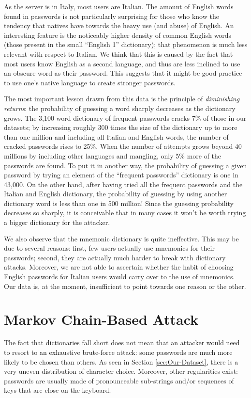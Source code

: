 \documentclass[a4paper,twocolumn]{article}
\begin{document}
As the server is in Italy, most users are Italian. The amount of English
words found in passwords is not particularly surprising for those
who know the tendency that natives have towards the heavy use (and
abuse) of English. An interesting feature is the noticeably higher
density of common English words (those present in the small {}``English
1'' dictionary); that phenomenon is much less relevant with respect
to Italian. We think that this is caused by the fact that most users
know English as a second language, and thus are less inclined to use
an obscure word as their password. This suggests that it might be
good practice to use one's native language to create stronger passwords.

The most important lesson drawn from this data is the principle of
\emph{diminishing returns}: the probability of guessing a word sharply
decreases as the dictionary grows. The 3,100-word dictionary of frequent
passwords cracks 7\% of those in our datasets; by increasing roughly
300 times the size of the dictionary up to more than one million and
including all Italian and English words, the number of cracked passwords
rises to 25\%. When the number of attempts grows beyond 40 millions
by including other languages and mangling, only 5\% more of the passwords
are found. To put it in another way, the probability of guessing a
given password by trying an element of the {}``frequent passwords''
dictionary is one in 43,000. On the other hand, after having tried
all the frequent passwords and the Italian and English dictionary,
the probability of guessing by using another dictionary word is less
than one in 500 million! Since the guessing probability decreases
so sharply, it is conceivable that in many cases it won't be worth
trying a bigger dictionary for the attacker.

We also observe that the mnemonic dictionary is quite ineffective.
This may be due to several reasons: first, few users actually use
mnemonics for their passwords; second, they are actually much harder
to break with dictionary attacks. Moreover, we are not able to ascertain
whether the habit of choosing English passwords for Italian users
would carry over to the use of mnemonics. Our data is, at the moment,
insufficient to point towards one reason or the other.


\section{Markov Chain-Based Attack}

\label{sec:Markov-Chain-Based-Attack}The fact that dictionaries fall
short does not mean that an attacker would need to resort to an exhaustive
brute-force attack: some passwords are much more likely to be chosen
than others. As seen in Section \ref{sec:Our-Dataset}, there is a
very uneven distribution of character choice. Moreover, other regularities
exist: passwords are usually made of pronounceable sub-strings and/or
sequences of keys that are close on the keyboard.
\end{document}
